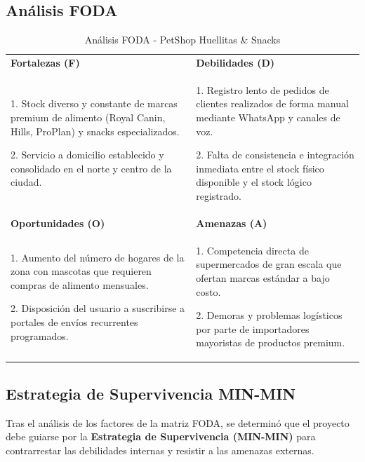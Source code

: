 \subsection{Análisis FODA}
\begin{table}[H]
    \centering
    \small
    \renewcommand{\arraystretch}{1.4}
    \begin{tabularx}{\textwidth}{|X|X|}
        \hline
        \rowcolor{upsblue} \multicolumn{2}{|c|}{\textcolor{white}{\textbf{MATRIZ FODA}}} \\
        \hline
        \rowcolor{lightgray} \textbf{Fortalezas (F)} & \textbf{Debilidades (D)} \\
        \hline
        1. Stock diverso y constante de marcas premium de alimento (Royal Canin, Hills, ProPlan) y snacks especializados. \par
        2. Servicio a domicilio establecido y consolidado en el norte y centro de la ciudad. & 
        1. Registro lento de pedidos de clientes realizados de forma manual mediante WhatsApp y canales de voz. \par
        2. Falta de consistencia e integración inmediata entre el stock físico disponible y el stock lógico registrado. \\
        \hline
        \rowcolor{lightgray} \textbf{Oportunidades (O)} & \textbf{Amenazas (A)} \\
        \hline
        1. Aumento del número de hogares de la zona con mascotas que requieren compras de alimento mensuales. \par
        2. Disposición del usuario a suscribirse a portales de envíos recurrentes programados. & 
        1. Competencia directa de supermercados de gran escala que ofertan marcas estándar a bajo costo. \par
        2. Demoras y problemas logísticos por parte de importadores mayoristas de productos premium. \\
        \hline
    \end{tabularx}
    \caption{Análisis FODA - PetShop Huellitas \& Snacks}
    \label{tab:foda}
\end{table}

\subsection{Estrategia de Supervivencia MIN-MIN}\label{sec:estrategia}
Tras el análisis de los factores de la matriz FODA, se determinó que el proyecto debe guiarse por la \textbf{Estrategia de Supervivencia (MIN-MIN)} para contrarrestar las debilidades internas y resistir a las amenazas externas. 

